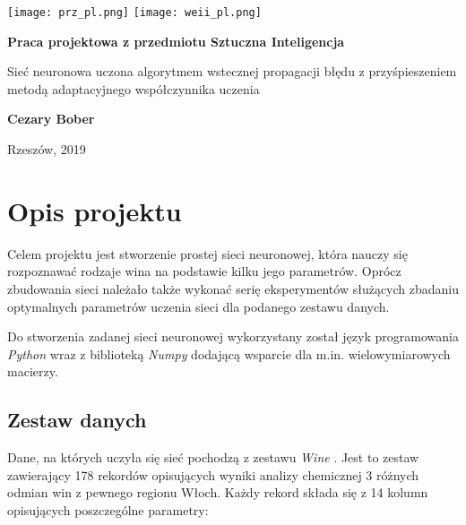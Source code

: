\documentclass[a4paper,12pt]{article}
\numberwithin{equation}{section}
\begin{document}

\begin{titlepage}
    \texttt{[image: prz\_pl.png]}
    \hfill
    \texttt{[image: weii\_pl.png]}
    
    \centering
    \vfill
    
    {\Huge \textbf{Praca projektowa z przedmiotu Sztuczna Inteligencja} \par}
	\vspace{1.5cm}
	{\LARGE Sieć neuronowa uczona algorytmem wstecznej propagacji błędu z przyśpieszeniem metodą adaptacyjnego współczynnika uczenia \par}
	
	\vfill
    
    {\Large \textbf{Cezary Bober} \par}
    
    \vfill
    
    {\LARGE Rzeszów, 2019\par}
\end{titlepage}

\setlength{\parskip}{0.3cm}
\setlength{\parindent}{1cm}
\setcounter{page}{2}

\tableofcontents
\pagebreak

\section{Opis projektu}
Celem projektu jest stworzenie prostej sieci neuronowej, która nauczy się rozpoznawać rodzaje wina na podstawie kilku jego parametrów. Oprócz zbudowania sieci należało także wykonać serię eksperymentów służących zbadaniu optymalnych parametrów uczenia sieci dla podanego zestawu danych.

Do stworzenia zadanej sieci neuronowej wykorzystany został język programowania \textit{Python} wraz z biblioteką \textit{Numpy} dodającą wsparcie dla m.in. wielowymiarowych macierzy.

\subsection{Zestaw danych}
Dane, na których uczyła się sieć pochodzą z zestawu \textit{Wine} \cite{dataset}. Jest to zestaw zawierający 178 rekordów opisujących wyniki analizy chemicznej 3 różnych odmian win z pewnego regionu Włoch. Każdy rekord składa się z 14 kolumn opisujących poszczególne parametry:
\end{document}
